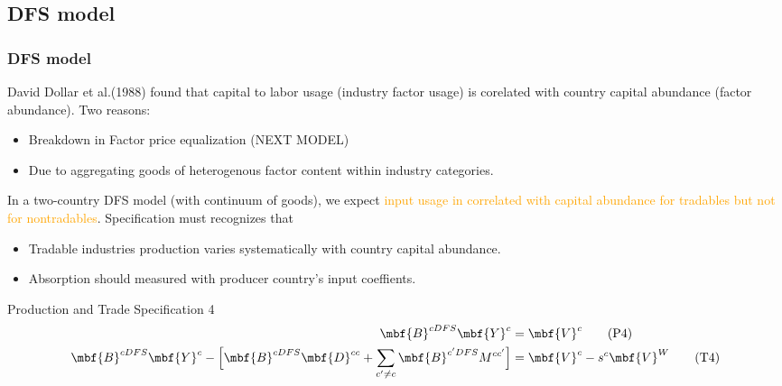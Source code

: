\documentclass[xcolor=svgnames,10pt]{beamer}
\begin{document}
\subsection{DFS model}
\begin{frame}[c]\frametitle{DFS model}
David Dollar et al.(1988) found that capital to labor usage (industry factor usage) is corelated with country capital abundance (factor abundance). Two reasons:
\begin{itemize}
    \item Breakdown in Factor price equalization (NEXT MODEL)
    \item Due to aggregating goods of heterogenous factor content within industry categories.
\end{itemize}

In a two-country DFS model (with continuum of goods), we expect \textcolor{orange}{input usage in correlated with capital abundance for tradables but not for nontradables}. Specification must recognizes that
\begin{itemize}
    \item Tradable industries production varies systematically with country capital abundance.
    \item Absorption should measured with producer country\rq{}s input coeffients.
\end{itemize}
\begin{block}{Production and Trade Specification 4}
\begin{align}
\mbf{B}^{cDFS}\mbf{Y}^{c} &= \mbf{V}^{c} \tag{P4}\\
\mbf{B}^{cDFS}\mbf{Y}^{c} - \Big[\mbf{B}^{cDFS}\mbf{D}^{cc}+\sum_{c^{\prime}\not=c}\mbf{B}^{c^{\prime}DFS} M^{cc^{\prime}}\Big] &=  \mbf{V}^{c} - s^{c} \mbf{V}^{W} \tag{T4}
\end{align}
\end{block}
\end{frame}
\end{document}
